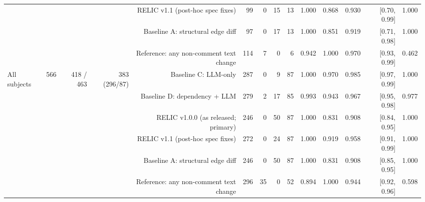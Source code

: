 \begin{tabular}{lrrrrrrrrrrrrr}
 &  &  &  & RELIC v1.1 (post-hoc spec fixes) & 99 & 0 & 15 & 13 & 1.000 & 0.868 & 0.930 & [0.70, 0.99] & 1.000 \\
 &  &  &  & Baseline A: structural edge diff & 97 & 0 & 17 & 13 & 1.000 & 0.851 & 0.919 & [0.71, 0.98] & 1.000 \\
 &  &  &  & Reference: any non-comment text change & 114 & 7 & 0 & 6 & 0.942 & 1.000 & 0.970 & [0.93, 0.99] & 0.462 \\
All subjects & 566 & 418 / 463 & 383 (296/87) & Baseline C: LLM-only & 287 & 0 & 9 & 87 & 1.000 & 0.970 & 0.985 & [0.97, 0.99] & 1.000 \\
 &  &  &  & Baseline D: dependency + LLM & 279 & 2 & 17 & 85 & 0.993 & 0.943 & 0.967 & [0.95, 0.98] & 0.977 \\
 &  &  &  & RELIC v1.0.0 (as released; primary) & 246 & 0 & 50 & 87 & 1.000 & 0.831 & 0.908 & [0.84, 0.95] & 1.000 \\
 &  &  &  & RELIC v1.1 (post-hoc spec fixes) & 272 & 0 & 24 & 87 & 1.000 & 0.919 & 0.958 & [0.91, 0.99] & 1.000 \\
 &  &  &  & Baseline A: structural edge diff & 246 & 0 & 50 & 87 & 1.000 & 0.831 & 0.908 & [0.85, 0.95] & 1.000 \\
 &  &  &  & Reference: any non-comment text change & 296 & 35 & 0 & 52 & 0.894 & 1.000 & 0.944 & [0.92, 0.96] & 0.598 \\
\bottomrule
\end{tabular}
